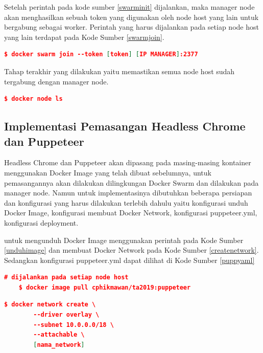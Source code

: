 			Setelah perintah pada kode sumber \ref{swarminit} dijalankan, maka manager node akan menghasilkan sebuah token yang digunakan oleh node host yang lain untuk bergabung sebagai worker. Perintah yang harus dijalankan pada setiap node host yang lain terdapat pada Kode Sumber \ref{swarmjoin}.
			\begin{lstlisting}[frame=single,tabsize=2,breaklines,caption={Perintah untuk bergabung ke Swarm},label=swarmjoin, captionpos=b, language=json,numbers=none]
	$ docker swarm join --token [token] [IP MANAGER]:2377
			\end{lstlisting}
			
			Tahap terakhir yang dilakukan yaitu memastikan semua node host sudah tergabung dengan manager node.
			\begin{lstlisting}[frame=single,tabsize=2,breaklines,caption={Perintah untuk melihat daftar Swarm Node},label=dockernodels, captionpos=b, language=json,numbers=none]
	$ docker node ls
			\end{lstlisting}
			
		\subsection{Implementasi Pemasangan Headless Chrome dan Puppeteer}
			Headless Chrome dan Puppeteer akan dipasang pada masing-masing kontainer menggunakan Docker Image yang telah dibuat sebelumnya, untuk pemasangannya akan dilakukan dilingkungan Docker Swarm dan dilakukan pada manager node. Namun untuk implementasinya dibutuhkan beberapa persiapan dan konfigurasi yang harus dilakukan terlebih dahulu yaitu konfigurasi unduh Docker Image, konfigurasi membuat Docker Network, konfigurasi puppeteer.yml, konfigurasi deployment.
			
			\indent untuk mengunduh Docker Image menggunakan perintah pada Kode Sumber \ref{unduhimage} dan membuat Docker Network pada Kode Sumber \ref{createnetwork}. Sedangkan konfigurasi puppeteer.yml dapat dilihat di Kode Sumber \ref{puppyaml}
			\begin{lstlisting}[frame=single,tabsize=2,breaklines,caption={Perintah untuk mengunduh Docker Image },label=unduhimage, captionpos=b, language=json,numbers=none]
	# dijalankan pada setiap node host
	$ docker image pull cphikmawan/ta2019:puppeteer
			\end{lstlisting}
			
			\begin{lstlisting}[frame=single,tabsize=2,breaklines,caption={Perintah untuk membuat Docker Network },label=createnetwork, captionpos=b, language=json,numbers=none]
	$ docker network create \
		--driver overlay \
		--subnet 10.0.0.0/18 \
		--attachable \
		[nama_network]
			\end{lstlisting}
			
